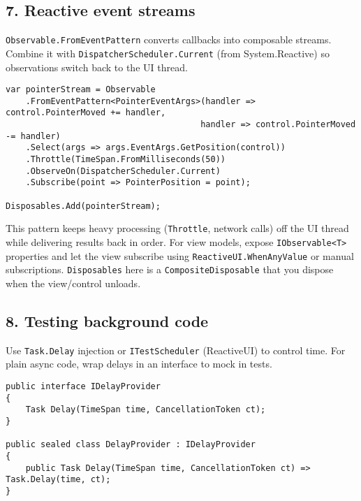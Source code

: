 \subsection{7. Reactive event streams}\label{reactive-event-streams}

\passthrough{\lstinline!Observable.FromEventPattern!} converts callbacks
into composable streams. Combine it with
\passthrough{\lstinline!DispatcherScheduler.Current!} (from
System.Reactive) so observations switch back to the UI thread.

\begin{lstlisting}
var pointerStream = Observable
    .FromEventPattern<PointerEventArgs>(handler => control.PointerMoved += handler,
                                       handler => control.PointerMoved -= handler)
    .Select(args => args.EventArgs.GetPosition(control))
    .Throttle(TimeSpan.FromMilliseconds(50))
    .ObserveOn(DispatcherScheduler.Current)
    .Subscribe(point => PointerPosition = point);

Disposables.Add(pointerStream);
\end{lstlisting}

This pattern keeps heavy processing (\passthrough{\lstinline!Throttle!},
network calls) off the UI thread while delivering results back in order.
For view models, expose \passthrough{\lstinline!IObservable<T>!}
properties and let the view subscribe using
\passthrough{\lstinline!ReactiveUI.WhenAnyValue!} or manual
subscriptions. \passthrough{\lstinline!Disposables!} here is a
\passthrough{\lstinline!CompositeDisposable!} that you dispose when the
view/control unloads.

\subsection{8. Testing background code}\label{testing-background-code}

Use \passthrough{\lstinline!Task.Delay!} injection or
\passthrough{\lstinline!ITestScheduler!} (ReactiveUI) to control time.
For plain async code, wrap delays in an interface to mock in tests.

\begin{lstlisting}
public interface IDelayProvider
{
    Task Delay(TimeSpan time, CancellationToken ct);
}

public sealed class DelayProvider : IDelayProvider
{
    public Task Delay(TimeSpan time, CancellationToken ct) => Task.Delay(time, ct);
}
\end{lstlisting}

